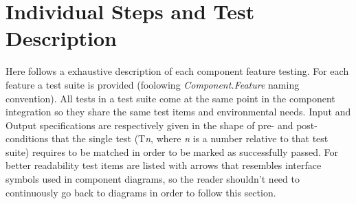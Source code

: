 \section{Individual Steps and Test Description}

Here follows a exhaustive description of each component feature testing. For each feature a test suite is provided (foolowing \textit{Component.Feature} naming convention). All tests in a test suite come at the same point in the component integration  so they share the same test items and environmental needs. Input and Output specifications are respectively given in the shape of pre- and post- conditions that the single test (T\textit{n}, where \textit{n} is a number relative to that test suite) requires to be matched in order to be marked as successfully passed. For better readability test items are listed with arrows that resembles interface symbols used in component diagrams, so the reader shouldn't need to continuously go back to diagrams in order to follow this section.


